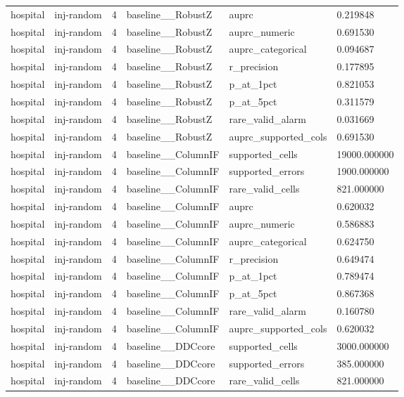 \begin{tabular}{llllll}
hospital & inj-random & 4 & baseline\_\_RobustZ & auprc & 0.219848 \\
hospital & inj-random & 4 & baseline\_\_RobustZ & auprc\_numeric & 0.691530 \\
hospital & inj-random & 4 & baseline\_\_RobustZ & auprc\_categorical & 0.094687 \\
hospital & inj-random & 4 & baseline\_\_RobustZ & r\_precision & 0.177895 \\
hospital & inj-random & 4 & baseline\_\_RobustZ & p\_at\_1pct & 0.821053 \\
hospital & inj-random & 4 & baseline\_\_RobustZ & p\_at\_5pct & 0.311579 \\
hospital & inj-random & 4 & baseline\_\_RobustZ & rare\_valid\_alarm & 0.031669 \\
hospital & inj-random & 4 & baseline\_\_RobustZ & auprc\_supported\_cols & 0.691530 \\
hospital & inj-random & 4 & baseline\_\_ColumnIF & supported\_cells & 19000.000000 \\
hospital & inj-random & 4 & baseline\_\_ColumnIF & supported\_errors & 1900.000000 \\
hospital & inj-random & 4 & baseline\_\_ColumnIF & rare\_valid\_cells & 821.000000 \\
hospital & inj-random & 4 & baseline\_\_ColumnIF & auprc & 0.620032 \\
hospital & inj-random & 4 & baseline\_\_ColumnIF & auprc\_numeric & 0.586883 \\
hospital & inj-random & 4 & baseline\_\_ColumnIF & auprc\_categorical & 0.624750 \\
hospital & inj-random & 4 & baseline\_\_ColumnIF & r\_precision & 0.649474 \\
hospital & inj-random & 4 & baseline\_\_ColumnIF & p\_at\_1pct & 0.789474 \\
hospital & inj-random & 4 & baseline\_\_ColumnIF & p\_at\_5pct & 0.867368 \\
hospital & inj-random & 4 & baseline\_\_ColumnIF & rare\_valid\_alarm & 0.160780 \\
hospital & inj-random & 4 & baseline\_\_ColumnIF & auprc\_supported\_cols & 0.620032 \\
hospital & inj-random & 4 & baseline\_\_DDCcore & supported\_cells & 3000.000000 \\
hospital & inj-random & 4 & baseline\_\_DDCcore & supported\_errors & 385.000000 \\
hospital & inj-random & 4 & baseline\_\_DDCcore & rare\_valid\_cells & 821.000000 \\

\end{tabular}
